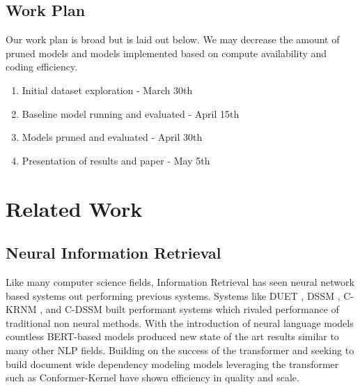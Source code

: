 \documentclass[sigplan,screen]{acmart}
\begin{document}
\subsection{Work Plan}
Our work plan is broad but is laid out below. We may decrease the amount of pruned models and models implemented based on compute availability and coding efficiency.  
\begin{enumerate}
    \item Initial dataset exploration - March 30th
    \item Baseline model running and evaluated - April 15th
    \item Models pruned and evaluated - April 30th
    \item Presentation of results and paper - May 5th
\end{enumerate}
\section{Related Work}
\subsection{Neural Information Retrieval}
Like many computer science fields, Information Retrieval has seen neural network based systems out performing previous systems. Systems like DUET \cite{Mitra2017LearningTM}, DSSM \cite{Huang2013LearningDS}, C-KRNM \cite{10.1145/3159652.3159659}, and C-DSSM \cite{Shen2014LearningSR} built performant systems which rivaled performance of traditional non neural methods. With the introduction of neural language models countless BERT-based models produced new state of the art results similar to many other NLP fields. Building on the success of the transformer and seeking to build document wide dependency modeling models leveraging the transformer such as Conformer-Kernel\cite{Mitra2020ConformerKernelWQ} have shown efficiency in quality and scale. 
\end{document}
